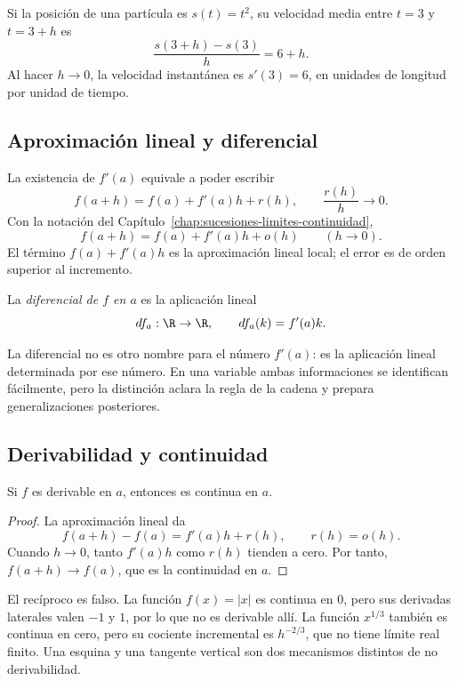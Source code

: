 \begin{ejemplo}
Si la posición de una partícula es \(s(t)=t^2\), su velocidad media entre
\(t=3\) y \(t=3+h\) es
\[
  \frac{s(3+h)-s(3)}{h}=6+h.
\]
Al hacer \(h\to0\), la velocidad instantánea es \(s'(3)=6\), en unidades de
longitud por unidad de tiempo.
\end{ejemplo}

\subsection{Aproximación lineal y diferencial}

La existencia de \(f'(a)\) equivale a poder escribir
\[
  f(a+h)=f(a)+f'(a)h+r(h),
  \qquad
  \frac{r(h)}{h}\longrightarrow0.
\]
Con la notación del Capítulo~\ref{chap:sucesiones-limites-continuidad},
\[
  f(a+h)=f(a)+f'(a)h+o(h)
  \qquad(h\to0).
\]
El término \(f(a)+f'(a)h\) es la aproximación lineal local; el error es de
orden superior al incremento.

\begin{definicion}
La \emph{diferencial de \(f\) en \(a\)} es la aplicación lineal
\[
  df_a:\R\to\R, \qquad df_a(k)=f'(a)k.
\]
\end{definicion}

La diferencial no es otro nombre para el número \(f'(a)\): es la aplicación
lineal determinada por ese número. En una variable ambas informaciones se
identifican fácilmente, pero la distinción aclara la regla de la cadena y
prepara generalizaciones posteriores.

\subsection{Derivabilidad y continuidad}

\begin{teorema}
Si \(f\) es derivable en \(a\), entonces es continua en \(a\).
\end{teorema}

\begin{proof}
La aproximación lineal da
\[
  f(a+h)-f(a)=f'(a)h+r(h),
  \qquad r(h)=o(h).
\]
Cuando \(h\to0\), tanto \(f'(a)h\) como \(r(h)\) tienden a cero. Por tanto,
\(f(a+h)\to f(a)\), que es la continuidad en \(a\).
\end{proof}

El recíproco es falso. La función \(f(x)=|x|\) es continua en \(0\), pero sus
derivadas laterales valen \(-1\) y \(1\), por lo que no es derivable allí. La
función \(x^{1/3}\) también es continua en cero, pero su cociente incremental
es \(h^{-2/3}\), que no tiene límite real finito. Una esquina y una tangente
vertical son dos mecanismos distintos de no derivabilidad.

